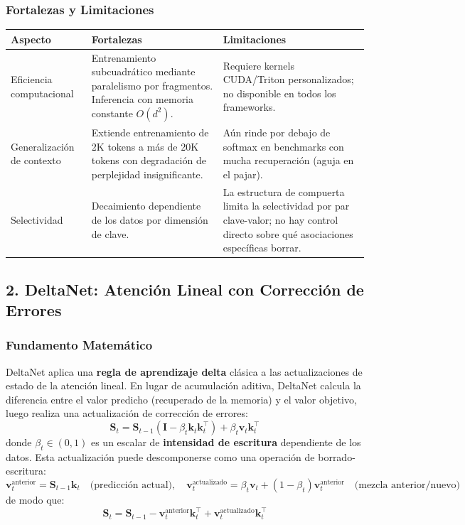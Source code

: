 \subsubsection{Fortalezas y Limitaciones}

\begin{table}[H]
\centering
\small
\begin{tabularx}{0.95\linewidth}{Xp{4cm}p{4cm}}
\toprule
\textbf{Aspecto} & \textbf{Fortalezas} & \textbf{Limitaciones} \\
\midrule
Eficiencia computacional & Entrenamiento subcuadrático mediante paralelismo por fragmentos. Inferencia con memoria constante $O(d^2)$. & Requiere kernels CUDA/Triton personalizados; no disponible en todos los frameworks. \\
Generalización de contexto & Extiende entrenamiento de 2K tokens a más de 20K tokens con degradación de perplejidad insignificante. & Aún rinde por debajo de softmax en benchmarks con mucha recuperación (aguja en el pajar). \\
Selectividad & Decaimiento dependiente de los datos por dimensión de clave. & La estructura de compuerta limita la selectividad por par clave-valor; no hay control directo sobre qué asociaciones específicas borrar. \\
\bottomrule
\end{tabularx}
\end{table}

\subsection{2. DeltaNet: Atención Lineal con Corrección de Errores}

\subsubsection{Fundamento Matemático}

DeltaNet \citep{yang_deltanet_2024} aplica una \textbf{regla de aprendizaje delta} clásica a las actualizaciones de estado de la atención lineal. En lugar de acumulación aditiva, DeltaNet calcula la diferencia entre el valor predicho (recuperado de la memoria) y el valor objetivo, luego realiza una actualización de corrección de errores:
\[
\mathbf{S}_t = \mathbf{S}_{t-1}(\mathbf{I} - \beta_t \mathbf{k}_t \mathbf{k}_t^\top) + \beta_t \mathbf{v}_t \mathbf{k}_t^\top
\]
donde $\beta_t \in (0,1)$ es un escalar de \textbf{intensidad de escritura} dependiente de los datos. Esta actualización puede descomponerse como una operación de borrado-escritura:
\[
\mathbf{v}_t^\text{anterior} = \mathbf{S}_{t-1} \mathbf{k}_t \quad \text{(predicción actual)}, \quad
\mathbf{v}_t^\text{actualizado} = \beta_t \mathbf{v}_t + (1-\beta_t)\mathbf{v}_t^\text{anterior} \quad \text{(mezcla anterior/nuevo)}
\]
de modo que:
\[
\mathbf{S}_t = \mathbf{S}_{t-1} - \mathbf{v}_t^\text{anterior}\mathbf{k}_t^\top + \mathbf{v}_t^\text{actualizado}\mathbf{k}_t^\top
\]

